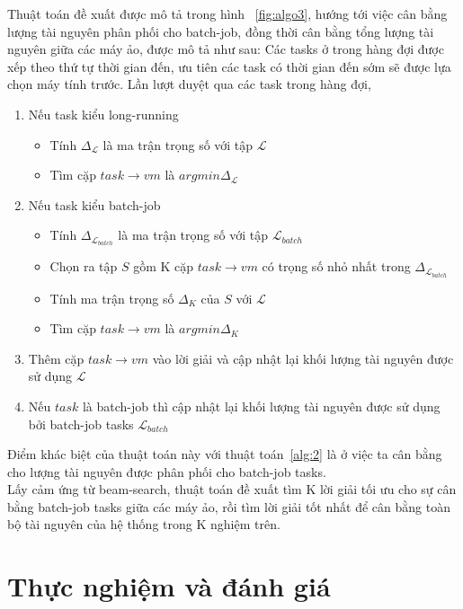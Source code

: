 \documentclass{my_style}
\begin{document}
Thuật toán đề xuất được mô tả trong hình ~\ref{fig:algo3}, hướng tới việc cân bằng lượng tài nguyên phân phối cho batch-job, đồng thời cân bằng tổng lượng tài nguyên giữa các máy ảo, được mô tả như sau: 
Các tasks ở trong hàng đợi được xếp theo thứ tự thời gian đến, ưu tiên các task có thời gian đến sớm sẽ được lựa chọn máy tính trước. Lần lượt duyệt qua các task trong hàng đợi, 
\begin{enumerate}
	\item Nếu task kiểu long-running	
		\begin{itemize}
			\item Tính $\Delta_{\mathcal{L}}$ là ma trận trọng số với tập $\mathcal{L}$
			\item Tìm cặp $task \rightarrow vm$ là $argmin\Delta_{\mathcal{L}}$
		\end{itemize}
	\item Nếu task kiểu batch-job 
		\begin{itemize}
			\item Tính $\Delta_{\mathcal{L}_{batch}}$ là ma trận trọng số với tập $\mathcal{L}_{batch}$
			\item Chọn ra tập $S$ gồm K cặp $task \rightarrow vm$ có trọng số nhỏ nhất trong $\Delta_{\mathcal{L}_{batch}}$
			\item Tính ma trận trọng số $\Delta_{K}$ của $S$ với $\mathcal{L}$
			\item Tìm cặp $task \rightarrow vm$ là $argmin\Delta_{K}$
		\end{itemize}
	\item Thêm cặp $task \rightarrow vm$ vào lời giải và cập nhật lại khối lượng tài nguyên được sử dụng $\mathcal{L}$
	\item Nếu $task$ là batch-job thì cập nhật lại khối lượng tài nguyên được sử dụng bởi batch-job tasks $\mathcal{L}_{batch}$
\end{enumerate}
Điểm khác biệt của thuật toán này với thuật toán~\ref{alg:2} là ở việc ta cân bằng cho lượng tài nguyên được phân phối cho batch-job tasks.\\
Lấy cảm ứng từ beam-search, thuật toán đề xuất tìm K lời giải tối ưu cho sự cân bằng batch-job tasks giữa các máy ảo, rồi tìm lời giải tốt nhất để cân bằng toàn bộ tài nguyên của hệ thống trong K nghiệm trên. 
\newpage 
\chapter{Thực nghiệm và đánh giá}
\label{Experiments}
\end{document}
